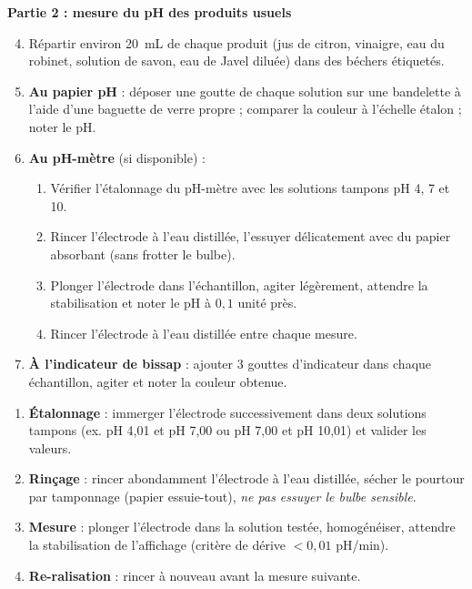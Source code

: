\documentclass[11pt]{article}
\begin{document}
\textbf{Partie 2 : mesure du pH des produits usuels}\par
\begin{enumerate}
\setcounter{enumi}{3}
\item Répartir environ \SI{20}{mL} de chaque produit (jus de citron, vinaigre, eau du robinet, solution de savon, eau de Javel diluée) dans des béchers étiquetés.
\item \textbf{Au papier pH} : déposer une goutte de chaque solution sur une bandelette à l'aide d'une baguette de verre propre ; comparer la couleur à l'échelle étalon ; noter le pH.
\item \textbf{Au pH-mètre} (si disponible) :
\begin{enumerate}
\item Vérifier l'étalonnage du pH-mètre avec les solutions tampons pH 4, 7 et 10.
\item Rincer l'électrode à l'eau distillée, l'essuyer délicatement avec du papier absorbant (sans frotter le bulbe).
\item Plonger l'électrode dans l'échantillon, agiter légèrement, attendre la stabilisation et noter le pH à $0,1$ unité près.
\item Rincer l'électrode à l'eau distillée entre chaque mesure.
\end{enumerate}
\item \textbf{À l'indicateur de bissap} : ajouter 3 gouttes d'indicateur dans chaque échantillon, agiter et noter la couleur obtenue.
\end{enumerate}

\begin{methode}
\begin{enumerate}
\item \textbf{Étalonnage} : immerger l'électrode successivement dans deux solutions tampons (ex. pH 4,01 et pH 7,00 ou pH 7,00 et pH 10,01) et valider les valeurs.
\item \textbf{Rinçage} : rincer abondamment l'électrode à l'eau distillée, sécher le pourtour par tamponnage (papier essuie-tout), \emph{ne pas essuyer le bulbe sensible}.
\item \textbf{Mesure} : plonger l'électrode dans la solution testée, homogénéiser, attendre la stabilisation de l'affichage (critère de dérive $< 0,01$ pH/min).
\item \textbf{Re-ralisation} : rincer à nouveau avant la mesure suivante.
\end{enumerate}
\end{methode}
\end{document}
